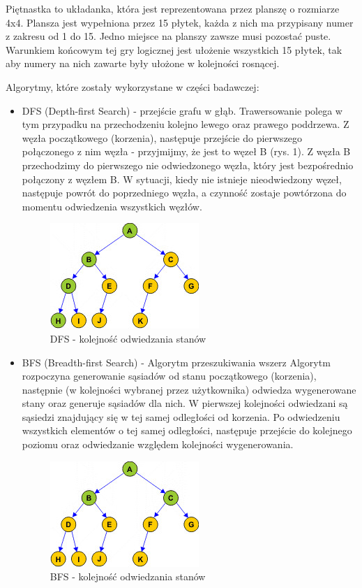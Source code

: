 \documentclass{classrep}
\begin{document}
{\color{black}
Piętnastka to układanka, która jest reprezentowana przez planszę o rozmiarze 4x4. Plansza jest wypełniona przez 15 płytek, każda z nich ma przypisany numer z zakresu od 1 do 15. Jedno miejsce na planszy zawsze musi pozostać puste. Warunkiem końcowym tej gry logicznej jest ułożenie wszystkich 15 płytek, tak aby numery na nich zawarte były ułożone w kolejności rosnącej.

Algorytmy, które zostały wykorzystane w części badawczej:
\begin{itemize}
  \item DFS (Depth-first Search) - przejście grafu w głąb. Trawersowanie polega w tym przypadku na przechodzeniu kolejno lewego oraz prawego poddrzewa. 
Z węzła początkowego (korzenia), następuje przejście do pierwszego połączonego z nim węzła - przyjmijmy, że jest to węzeł B (rys. 1). Z węzła B przechodzimy do pierwszego nie odwiedzonego węzła, który jest bezpośrednio połączony z węzłem B. W sytuacji, kiedy nie istnieje nieodwiedzony węzeł, następuje powrót do poprzedniego węzła, a czynność zostaje powtórzona do momentu odwiedzenia wszystkich węzłów.

\begin{figure}[ht!]
	\begin{center}
		\includegraphics[scale=0.5]{dfs_tree}
		\caption{DFS - kolejność odwiedzania stanów}
	\end{center}
\end{figure}

  \item BFS (Breadth-first Search) - Algorytm przeszukiwania wszerz
Algorytm rozpoczyna generowanie sąsiadów od stanu początkowego (korzenia), następnie (w kolejności wybranej przez użytkownika) odwiedza wygenerowane stany oraz generuje sąsiadów dla nich. W pierwszej kolejności odwiedzani są sąsiedzi znajdujący się w tej samej odległości od korzenia. Po odwiedzeniu wszystkich elementów o tej samej odległości, następuje przejście do kolejnego poziomu oraz odwiedzanie względem kolejności wygenerowania.

\begin{figure}[ht!]
	\begin{center}
		\includegraphics[scale=0.5]{bfs_tree}
		\caption{BFS - kolejność odwiedzania stanów}
	\end{center}
\end{figure}
\newpage


\end{itemize}}
\end{document}
